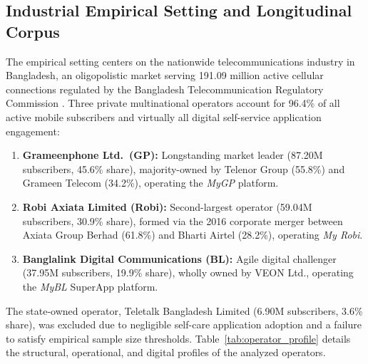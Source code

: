\documentclass[review,12pt,authoryear]{elsarticle}
\begin{document}
\subsection{Industrial Empirical Setting and Longitudinal Corpus}
The empirical setting centers on the nationwide telecommunications industry in Bangladesh, an oligopolistic market serving 191.09 million active cellular connections regulated by the Bangladesh Telecommunication Regulatory Commission \citep[BTRC;][]{btrc2024annual, btrc2026quarterly}. Three private multinational operators account for 96.4\% of all active mobile subscribers and virtually all digital self-service application engagement:
\begin{enumerate}
    \item \textbf{Grameenphone Ltd.\ (GP):} Longstanding market leader (87.20M subscribers, 45.6\% share), majority-owned by Telenor Group (55.8\%) and Grameen Telecom (34.2\%), operating the \textit{MyGP} platform.
    \item \textbf{Robi Axiata Limited (Robi):} Second-largest operator (59.04M subscribers, 30.9\% share), formed via the 2016 corporate merger between Axiata Group Berhad (61.8\%) and Bharti Airtel (28.2\%), operating \textit{My Robi}.
    \item \textbf{Banglalink Digital Communications (BL):} Agile digital challenger (37.95M subscribers, 19.9\% share), wholly owned by VEON Ltd., operating the \textit{MyBL} SuperApp platform.
\end{enumerate}
The state-owned operator, Teletalk Bangladesh Limited (6.90M subscribers, 3.6\% share), was excluded due to negligible self-care application adoption and a failure to satisfy empirical sample size thresholds. Table~\ref{tab:operator_profile} details the structural, operational, and digital profiles of the analyzed operators.
\end{document}
